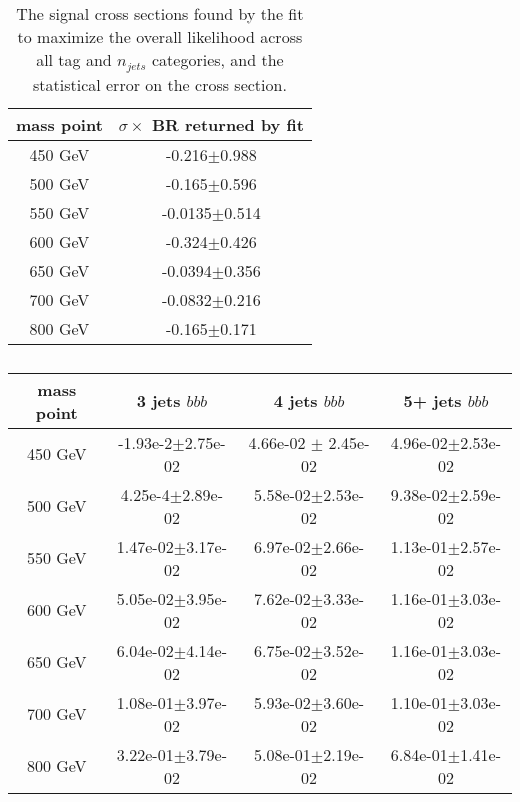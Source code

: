 \begin{table}
    \center
    \caption{The signal cross sections found by the fit to maximize
    the overall likelihood across all tag and $n_{jets}$ categories, 
    and the statistical error on the cross section. \label{tab:muReturned}} 
    \begin{tabular}{ c c } \hline \hline
    mass point & $\sigma\times$ BR returned by fit \\ \hline
    450 GeV & -0.216$\pm$0.988 \\
    500 GeV & -0.165$\pm$0.596 \\
    550 GeV & -0.0135$\pm$0.514 \\
    600 GeV & -0.324$\pm$0.426 \\
    650 GeV & -0.0394$\pm$0.356 \\
    700 GeV & -0.0832$\pm$0.216 \\ 
    800 GeV & -0.165$\pm$0.171 \\
    \end{tabular}
\end{table}


\begin{table}
    \center
    \caption{\label{tab:Slopes_bbb}}
    \begin{tabular}{ c c c c } \hline \hline
        mass point & 3 jets $bbb$ & 4 jets $bbb$ & 5+ jets $bbb$ \\ \hline
        450 GeV & -1.93e-2$\pm$2.75e-02 & 4.66e-02 $\pm$ 2.45e-02 & 4.96e-02$\pm$2.53e-02 \\
        500 GeV & 4.25e-4$\pm$2.89e-02 & 5.58e-02$\pm$2.53e-02 & 9.38e-02$\pm$2.59e-02 \\
        550 GeV & 1.47e-02$\pm$3.17e-02 & 6.97e-02$\pm$2.66e-02 & 1.13e-01$\pm$2.57e-02 \\
        600 GeV & 5.05e-02$\pm$3.95e-02 & 7.62e-02$\pm$3.33e-02 & 1.16e-01$\pm$3.03e-02 \\
        650 GeV & 6.04e-02$\pm$4.14e-02 & 6.75e-02$\pm$3.52e-02 & 1.16e-01$\pm$3.03e-02 \\
        700 GeV & 1.08e-01$\pm$3.97e-02 & 5.93e-02$\pm$3.60e-02 & 1.10e-01$\pm$3.03e-02 \\
        800 GeV & 3.22e-01$\pm$3.79e-02 & 5.08e-01$\pm$2.19e-02 & 6.84e-01$\pm$1.41e-02 \\
    \end{tabular}
\end{table}




